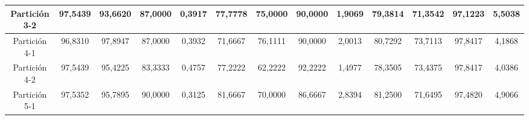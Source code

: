 \documentclass[12pt]{article}
\begin{document}
\begin{table}[H]
{\begin{tabular}{|c|cccc|cccc|cccc|}
Partición 3-2 & \multicolumn{1}{c|}{97,5439}                                                  & \multicolumn{1}{c|}{93,6620}                                                 & \multicolumn{1}{c|}{87,0000} & 0,3917 & \multicolumn{1}{c|}{77,7778}                                                  & \multicolumn{1}{c|}{75,0000}                                                 & \multicolumn{1}{c|}{90,0000} & 1,9069 & \multicolumn{1}{c|}{79,3814}                                                  & \multicolumn{1}{c|}{71,3542}                                                 & \multicolumn{1}{c|}{97,1223} & 5,5038 \\ \hline
Partición 4-1 & \multicolumn{1}{c|}{96,8310}                                                  & \multicolumn{1}{c|}{97,8947}                                                 & \multicolumn{1}{c|}{87,0000} & 0,3932 & \multicolumn{1}{c|}{71,6667}                                                  & \multicolumn{1}{c|}{76,1111}                                                 & \multicolumn{1}{c|}{90,0000} & 2,0013 & \multicolumn{1}{c|}{80,7292}                                                  & \multicolumn{1}{c|}{73,7113}                                                 & \multicolumn{1}{c|}{97,8417} & 4,1868 \\ \hline
Partición 4-2 & \multicolumn{1}{c|}{97,5439}                                                  & \multicolumn{1}{c|}{95,4225}                                                 & \multicolumn{1}{c|}{83,3333} & 0,4757 & \multicolumn{1}{c|}{77,2222}                                                  & \multicolumn{1}{c|}{62,2222}                                                 & \multicolumn{1}{c|}{92,2222} & 1,4977 & \multicolumn{1}{c|}{78,3505}                                                  & \multicolumn{1}{c|}{73,4375}                                                 & \multicolumn{1}{c|}{97,8417} & 4,0386 \\ \hline
Partición 5-1 & \multicolumn{1}{c|}{97,5352}                                                  & \multicolumn{1}{c|}{95,7895}                                                 & \multicolumn{1}{c|}{90,0000} & 0,3125 & \multicolumn{1}{c|}{81,6667}                                                  & \multicolumn{1}{c|}{70,0000}                                                 & \multicolumn{1}{c|}{86,6667} & 2,8394 & \multicolumn{1}{c|}{81,2500}                                                  & \multicolumn{1}{c|}{71,6495}                                                 & \multicolumn{1}{c|}{97,4820} & 4,9066 \\ \hline

\end{tabular}}
\end{table}
\end{document}
